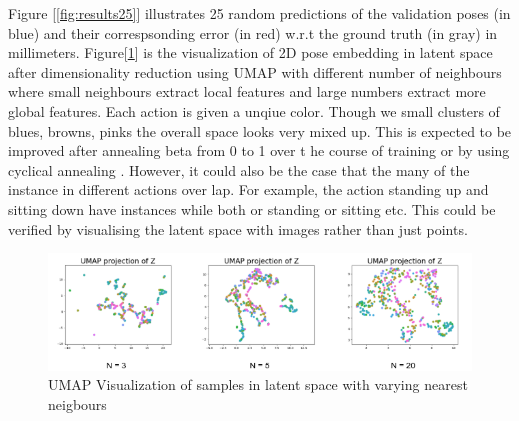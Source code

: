Figure [\ref{fig:results25}] illustrates 25 random predictions of the validation poses (in blue) and their correspsonding error (in red) w.r.t the ground truth (in gray) in millimeters. Figure[\ref{fig:latentspace}] is the visualization of 2D pose embedding in latent space after dimensionality reduction using \ac{UMAP} with different number of neighbours where small neighbours extract local features and large numbers extract more global features. Each action is given a unqiue color. Though we small clusters of blues, browns, pinks the overall space looks very mixed up. This is expected to be improved after annealing beta from 0 to 1 over t he course of training or by using cyclical annealing \cite{cyclicbeta}. However, it could also be the case that the many of the instance in different actions over lap. For example, the action standing up and sitting down have instances while both or standing or sitting etc. This could be verified by visualising the latent space with images rather than just points.  

\begin{figure}[h]
    \centering
    \includegraphics[width=\textwidth]{figures/latentspace.png}
    \caption{UMAP Visualization of samples in latent space with varying nearest neigbours}
    \label{fig:latentspace}
\end{figure}